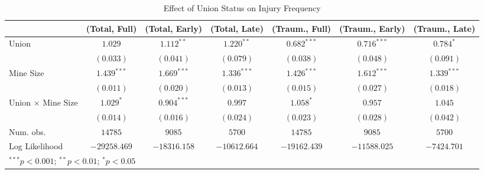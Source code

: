 
\begin{table}[H]
\begin{center}
\begin{tabular}{l c c c c c c}
\hline
 & (Total, Full) & (Total, Early) & (Total, Late) & (Traum., Full) & (Traum., Early) & (Traum., Late) \\
\hline
Union                      & $1.029$       & $1.112^{**}$  & $1.220^{**}$  & $0.682^{***}$ & $0.716^{***}$ & $0.784^{*}$   \\
                           & $(0.033)$     & $(0.041)$     & $(0.079)$     & $(0.038)$     & $(0.048)$     & $(0.091)$     \\
Mine Size                  & $1.439^{***}$ & $1.669^{***}$ & $1.336^{***}$ & $1.426^{***}$ & $1.612^{***}$ & $1.339^{***}$ \\
                           & $(0.011)$     & $(0.020)$     & $(0.013)$     & $(0.015)$     & $(0.027)$     & $(0.018)$     \\
Union $ \times $ Mine Size & $1.029^{*}$   & $0.904^{***}$ & $0.997$       & $1.058^{*}$   & $0.957$       & $1.045$       \\
                           & $(0.014)$     & $(0.016)$     & $(0.024)$     & $(0.023)$     & $(0.028)$     & $(0.042)$     \\
\hline
Num. obs.                  & $14785$       & $9085$        & $5700$        & $14785$       & $9085$        & $5700$        \\
Log Likelihood             & $-29258.469$  & $-18316.158$  & $-10612.664$  & $-19162.439$  & $-11588.025$  & $-7424.701$   \\
\hline
\multicolumn{7}{l}{\scriptsize{$^{***}p<0.001$; $^{**}p<0.01$; $^{*}p<0.05$}}
\end{tabular}
\caption{Effect of Union Status on Injury Frequency}
\label{irr_100employees_injuries}
\end{center}
\end{table}

